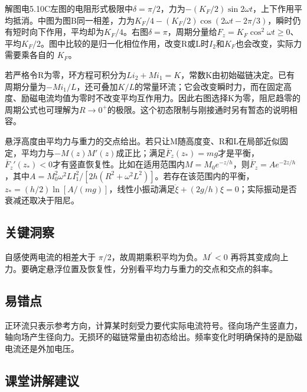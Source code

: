 \documentclass[UTF8,fontset=fandol,a4paper,11pt]{ctexart}
\begin{document}
解图电5.10C左图的电阻形式极限中$\delta=\pi/2$，力为$-(K_F/2)\sin2\omega t$，上下作用平均抵消。中图为图B同一相差，力为$K_F/4-(K_F/2)\cos(2\omega t-2\pi/3)$，瞬时仍有短时向下作用，平均却为$K_F/4$。右图$\delta=\pi$，周期分量给$F_z=K_F\cos^2\omega t\ge0$、平均$K_F/2$。图中比较的是归一化相位作用，改变R或L时$I_2$和$K_F$也会改变，实际力需要乘各自的 $K_F$。

若严格令R为零，环方程可积分为$Li_2+Mi_1=K$，常数K由初始磁链决定。已有周期分量为$-Mi_1/L$，还可叠加$K/L$的常量环流；它会改变瞬时力，而在固定高度、励磁电流均值为零时不改变平均互作用力。因此右图选择K为零，阻尼趋零的周期公式也可理解为$R\to0^+$的极限。这个初态限制与刚接通时另有暂态的说明相容。

悬浮高度由平均力与重力的交点给出。若只让M随高度变、R和L在局部近似固定，平均力与$-M(z)M'(z)$成正比；满足$\overline F_z(z_*)=mg$才是平衡，$\overline F_z'(z_*)<0$才有竖直恢复性。比如在适用范围内$M=M_0e^{-z/h}$，则$\overline F_z=Ae^{-2z/h}$，其中$A=M_0^2\omega^2LI_1^2/[2h(R^2+\omega^2L^2)]$。若存在该范围内的平衡，$z_*=(h/2)\ln[A/(mg)]$，线性小振动满足$\ddot\xi+(2g/h)\xi=0$；实际振动是否衰减还取决于阻尼。




\subsection*{关键洞察}

自感使两电流的相差大于 $\pi/2$，故周期乘积平均为负。$M^{\prime}<0$ 再将其变成向上力。要确定悬浮位置及恢复性，分别看平均力与重力的交点和交点的斜率。



\subsection*{易错点}

正环流只表示参考方向，计算某时刻受力要代实际电流符号。径向场产生竖直力，轴向场产生径向力。无损环的磁链常量由初态给出。频率变化时明确保持的是励磁电流还是外加电压。



\subsection*{课堂讲解建议}
\end{document}
